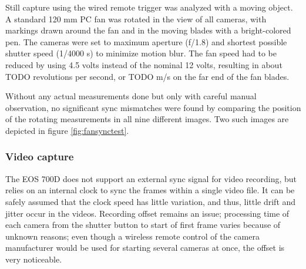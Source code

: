 Still capture using the wired remote trigger was analyzed with a moving object.
A standard 120 mm PC fan was rotated in the view of all cameras, with markings drawn around the fan and in the moving blades with a bright-colored pen.
The cameras were set to maximum aperture (f/1.8) and shortest possible shutter speed (1/4000 s) to minimize motion blur.
The fan speed had to be reduced by using 4.5 volts instead of the nominal 12 volts, resulting in about TODO revolutions per second, or TODO m/s on the far end of the fan blades.

Without any actual measurements done but only with careful manual observation, no significant sync mismatches were found by comparing the position of the rotating measurements in all nine different images.
Two such images are depicted in figure \ref{fig:fansynctest}.


%


\subsubsection{Video capture}


The EOS 700D does not support an external sync signal for video recording, but relies on an internal clock to sync the frames within a single video file.
It can be safely assumed that the clock speed has little variation, and thus, little drift and jitter occur in the videos.
Recording offset remains an issue;
processing time of each camera from the shutter button to start of first frame varies because of unknown reasons; even though a wireless remote control of the camera manufacturer would be used for starting several cameras at once, the offset is very noticeable.

